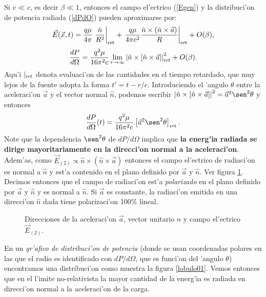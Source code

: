 Si $v\ll c$, es decir $\beta\ll1$, entonces el campo el'ectrico
(\ref{Egen}) y la distribuci'on de potencia radiada (\ref{dPdO}) pueden
aproximarse por:
\begin{equation}
\vec{E}(\vec{x},t)=\frac{q\mu}{4\pi}\left.\frac{\hat{n}}{R^2}\right|_{\rm ret}+\left.
\frac{q\mu}{4\pi c^2}\frac{\hat{n}\times(\hat{n}\times{\vec{a}})}{R}\right|_{\rm
ret} +O(\beta),
\end{equation}
\begin{equation}
\frac{dP}{d\Omega}=\frac{q^2\mu}{16\pi^2c}\lim_{r\rightarrow\infty}
\left|\hat{n}\times\left[
\hat{n}\times{\vec{a}}\right]\right|^2_{\rm ret}  +O(\beta).
\end{equation}
Aqu'i $|_{\rm ret}$ denota evaluaci'on de las cantidades en el tiempo retardado, que muy lejos de la fuente adopta la forma $t'=t-r/c$.
Introduciendo el 'angulo $\theta$ entre la aceleraci'on $\vec{a}$ y el vector
normal $\hat{n}$, podemos escribir
$\left|\hat{n}\times\left[\hat{n}\times{\vec{a}}\right]\right|^2=\vec{a}^2\sen^2\theta$ y entonces
\begin{equation}
\frac{dP}{d\Omega}(t)=\frac{q^2\mu}{16\pi^2 c}\left[ \vec{a}^2\sen^2\theta\right]_{\rm
ret} .\label{Lardif}
\end{equation}
 Note que la dependencia $\sen^2\theta$ de ${dP}/{d\Omega}$ implica que \textbf{la
energ'ia radiada se dirige mayoritariamente en la direcci'on normal a la
aceleraci'on}. Adem'as, como $\vec{E}_{(2)}\propto
\hat{n}\times(\hat{n}\times{\vec{a}})$ entonces el campo el'ectrico de
radiaci'on  es normal a $\hat{n}$ y est'a contenido en el plano definido por
$\vec{a}$ y $\hat{n}$. Ver figura \ref{fig:natheta}.
 Decimos entonces que el campo de radiaci'on est'a
\textit{polarizado} en el plano definido por $\vec{a}$ y $\hat{n}$ y es normal a
$\hat{n}$. Si $\vec{a}$ es constante, la radiaci'on emitida en una direcci'on $\hat{n}$ dada tiene polarizaci'on 100\% lineal.
\begin{figure}[!h]
\centerline{}
\caption{Direcciones de la aceleraci'on $\vec{a}$, vector unitario $\hat{n}$ y campo el'ectrico $\vec{E}_{(2)}$.}
\label{fig:natheta}
\end{figure}
En un \textit{gr'afico de distribuci'on de potencia} (donde se usan coordenadas polares
en las que el radio es identificado con ${dP}/{d\Omega}$, que es funci'on
del 'angulo $\theta$) encontramos una distribuci'on como muestra la figura
\ref{lobulo01}. Vemos entonces que en el l'imite no-relativista la mayor
cantidad de la energ'ia es radiada en direcci'on normal a la aceleraci'on de la
carga.

